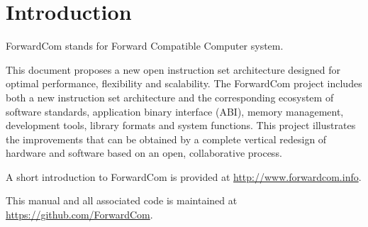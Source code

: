 \documentclass[forwardcom.tex]{subfiles}
\begin{document}
\RaggedRight

\chapter{Introduction}
ForwardCom stands for Forward Compatible Computer system.
\vspace{2mm}

This document proposes a new open instruction set architecture designed for optimal performance, flexibility and scalability. The ForwardCom project includes both a new instruction set architecture and the corresponding ecosystem of software standards, application binary interface (ABI), memory management, development tools, library formats and system functions. This project illustrates the improvements that can be obtained by a complete vertical redesign of hardware and software based on an open, collaborative process.
\vspace{2mm}

A short introduction to ForwardCom is provided at 
\href{http://www.forwardcom.info}{http://www.forwardcom.info}.
\vspace{2mm}

This manual and all associated code is maintained at 
\href{https://github.com/ForwardCom/}{https://github.com/ForwardCom}.

 
\end{document}
